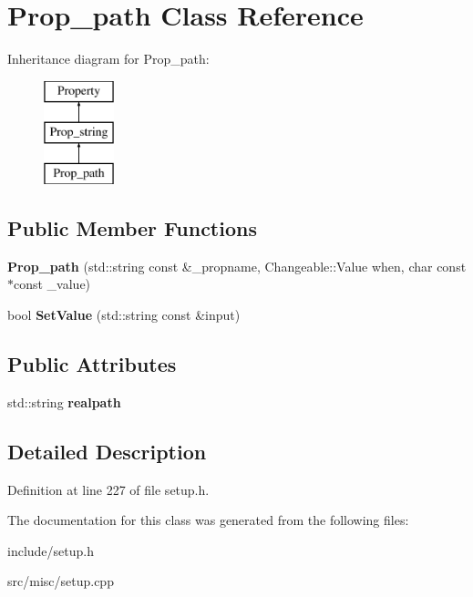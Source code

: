 \hypertarget{classProp__path}{\section{Prop\-\_\-path Class Reference}
\label{classProp__path}
}
Inheritance diagram for Prop\-\_\-path\-:\begin{figure}[H]
\begin{center}
\leavevmode
\includegraphics[height=3.000000cm]{classProp__path}
\end{center}
\end{figure}
\subsection*{Public Member Functions}
\begin{DoxyCompactItemize}
\item 
\hypertarget{classProp__path_a913eabbbfd399fed38f39381946e2eba}{{\bfseries Prop\-\_\-path} (std\-::string const \&\-\_\-propname, Changeable\-::\-Value when, char const $\ast$const \-\_\-value)}\label{classProp__path_a913eabbbfd399fed38f39381946e2eba}

\item 
\hypertarget{classProp__path_a7f62b7439d73db8627ac3c0ea4f04748}{bool {\bfseries Set\-Value} (std\-::string const \&input)}\label{classProp__path_a7f62b7439d73db8627ac3c0ea4f04748}

\end{DoxyCompactItemize}
\subsection*{Public Attributes}
\begin{DoxyCompactItemize}
\item 
\hypertarget{classProp__path_aa4281b80a9ba382027add3a82eecd7c3}{std\-::string {\bfseries realpath}}\label{classProp__path_aa4281b80a9ba382027add3a82eecd7c3}

\end{DoxyCompactItemize}


\subsection{Detailed Description}


Definition at line 227 of file setup.\-h.



The documentation for this class was generated from the following files\-:\begin{DoxyCompactItemize}
\item 
include/setup.\-h\item 
src/misc/setup.\-cpp\end{DoxyCompactItemize}
